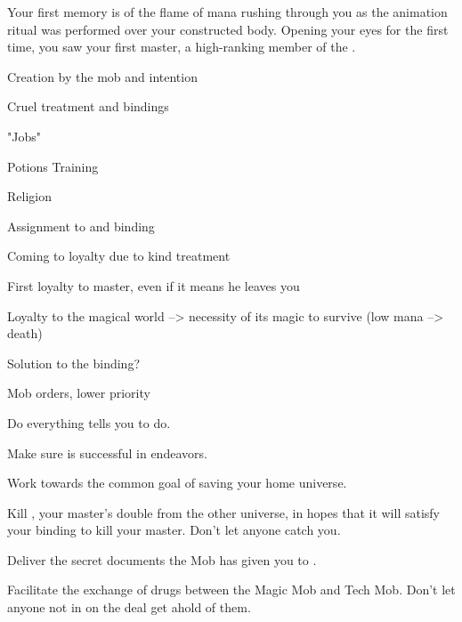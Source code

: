 \documentclass[char]{guildcamp3}
\begin{document}
\name{\cServant{}}


Your first memory is of the flame of mana rushing through you as the animation ritual was performed over your constructed body. Opening your eyes for the first time, you saw your first master, a high-ranking member of the \bMagicMob{}.

Creation by the mob and intention

Cruel treatment and bindings

"Jobs"

Potions Training

Religion

Assignment to \cNobleOne{} and binding

Coming to loyalty due to kind treatment

First loyalty to master, even if it means he leaves you

Loyalty to the magical world --> necessity of its magic to survive
(low mana --> death)

Solution to the binding?

Mob orders, lower priority

\begin{itemz}[Goals]
  \item Do everything \cNobleOne{} tells you to do.
  \item Make sure \cNobleOne{} is successful in \cNobleOne{\their} endeavors.
  \item Work towards the common goal of saving your home universe.
  \item Kill \cPoliOne{}, your master's double from the other universe, in hopes that it will satisfy your binding to kill your master. Don't let anyone catch you.
  \item Deliver the secret documents the Mob has given you to \cSpecOpTwo{}.
  \item Facilitate the exchange of drugs between the Magic Mob and Tech Mob. Don't let anyone not in on the deal get ahold of them.
\end{itemz}
\end{document}

